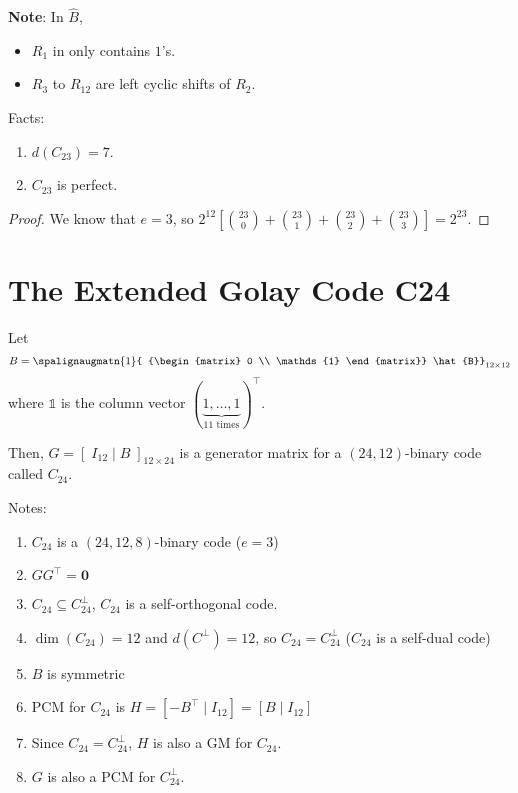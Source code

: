 \textbf{Note}: In $ \hat{B} $,
\begin{itemize}
    \item $ R_1 $ in only contains $ 1 $'s.
    \item $ R_3 $ to $ R_{12} $ are left cyclic shifts of $ R_2 $.
\end{itemize}

\begin{thmbox}
    \begin{theorem}
        Facts:
        \begin{enumerate}
            \item $ d(C_{23})=7 $.
            \item $ C_{23} $ is perfect.
        \end{enumerate}
    \end{theorem}
\end{thmbox}

\begin{proof}
    We know that $ e=3 $, so
    $ 2^{12}\left[ \binom{23}{0}+\binom{23}{1}+\binom{23}{2}+\binom{23}{3} \right]=
        2^{23} $.
\end{proof}

\section{The Extended Golay Code C24}
Let
\[ B=\spalignaugmatn{1}{
        {\begin{matrix}
                    0 \\
                    \mathds{1}
                \end{matrix}}
        \hat{B}}_{12\times{} 12}
\]
where $ \mathds{1} $ is the column vector $ (\underbrace{1,\ldots ,1}_{11\text{ times}})^\top $.

Then, $ G=\left[\; I_{12}\mid B \;\right]_{12\times 24} $ is a generator
matrix for a $ (24,12) $-binary code called $ C_{24} $.

Notes:
\begin{enumerate}[label=(\roman*)]
    \item $ C_{24} $ is a $ (24,12,8) $-binary code ($ e=3 $)
    \item $ GG^\top=\bm{0} $
    \item $ C_{24}\subseteq C_{24}^\perp $, $ C_{24} $ is a self-orthogonal code.
    \item $ \dim (C_{24})=12 $ and $ d(C^{\perp})=12 $, so
          $ C_{24}=C_{24}^\perp $ ($ C_{24} $ is a self-dual code)
    \item $ B $ is symmetric
    \item PCM for $ C_{24} $ is $ H=\left[ -B ^\top \mid I_{12} \right]=
              \left[ B\mid I_{12} \right] $
    \item Since $ C_{24}=C_{24}^\perp $, $ H $ is also a GM for $ C_{24} $.
    \item $ G $ is also a PCM for $ C_{24}^\perp $.
\end{enumerate}

